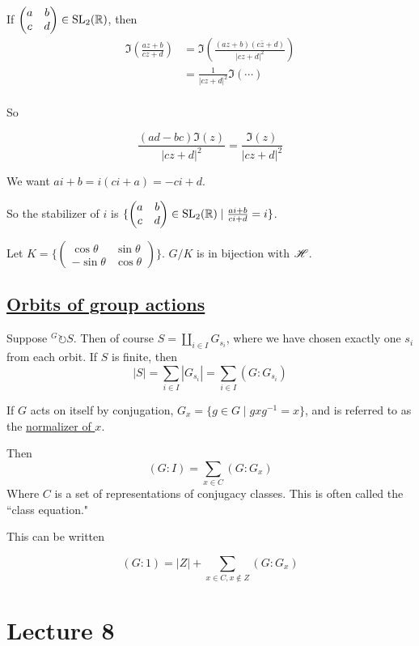 \documentclass[x11names,reqno,14pt]{extarticle}
\begin{document}
If $\begin{pmatrix} a & b \\ c & d\\ \end{pmatrix} \in {\mathrm{SL}}_2(\mathbb{R})$, then 
\begin{align*}
\Im\left(\frac{az + b}{cz + d}\right) & = \Im\left(\frac{(az + b)(c\bar{z} + d)}{|cz + d|^2}\right) \\
					& = \frac{1}{|cz + d|^2}\Im(\cdots )\\
\end{align*}

So 

\[
\frac{(ad - bc)\Im(z)}{|cz + d|^2} = \frac{\Im(z)}{|cz + d|^2}
\]

We want $ai + b = i(ci + a) = -ci + d$. 

So the stabilizer of $i$ is $\{\begin{pmatrix} a & b \\ c & d \end{pmatrix} \in {\mathrm{SL}}_2(\mathbb{R}) \mid \frac{ai + b}{ci + d} = i \}$. 

Let $K = \{\begin{pmatrix} \cos\theta & \sin\theta \\ -\sin\theta & \cos\theta\end{pmatrix} \}$. $G/K$ is in bijection with $\mathscr{H}$. 

\subsection*{\underline{Orbits of group actions}}

Suppose ${}^G \circlearrowright S$. Then of course $S = \coprod_{i\in I}G_{s_i}$, where we have chosen exactly one $s_i$ from each orbit. If $S$ is finite, then 
\[
|S| = \sum_{i\in I}|G_{s_i}| = \sum_{i\in I}(G:G_{s_i})
\]


If $G$ acts on itself by conjugation, $G_x = \{g \in G \mid gxg^{-1} = x\}$, and is referred to as the \underline{normalizer of $x$}. 

Then 
\[
(G:I) = \sum_{x \in C}(G: G_x)
\]
Where $C$ is a set of representations of conjugacy classes. This is often called the ``class equation." 

This can be written

\[
(G:1) = |Z| + \sum_{x\in C, x\not\in Z}(G:G_x)
\]


\section*{Lecture 8}
\end{document}
